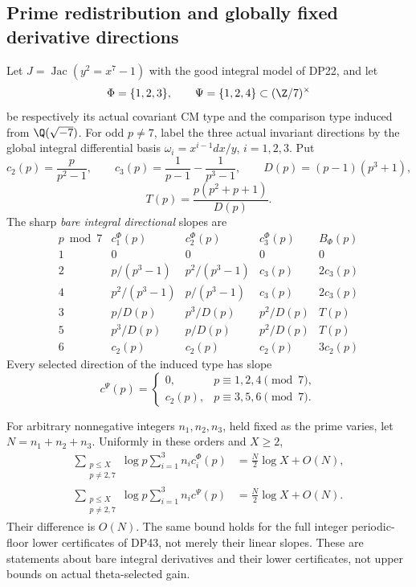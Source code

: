 \subsection{Prime redistribution and globally fixed derivative directions}

\begin{theorem}\label{DP53}
Let $J=\operatorname{Jac}(y^2=x^7-1)$ with the good integral model of DP22, and let
\[
 \Phi=\{1,2,3\},\qquad\Psi=\{1,2,4\}
       \subset(\Z/7)^\times
\]
be respectively its actual covariant CM type and the comparison type induced from $\Q(\sqrt{-7})$.
For odd $p\ne7$, label the three actual invariant directions by the global integral differential basis
$\omega_i=x^{i-1}dx/y$, $i=1,2,3$.
Put
\[
 c_2(p)=\frac{p}{p^2-1},\qquad
 c_3(p)=\frac1{p-1}-\frac1{p^3-1},\qquad
 D(p)=(p-1)(p^3+1),
\]
\[
 T(p)=\frac{p(p^2+p+1)}{D(p)}.
\]
The sharp \emph{bare integral directional} slopes are
\[
\begin{array}{c|ccc|c}
p\bmod7&c_1^\Phi(p)&c_2^\Phi(p)&c_3^\Phi(p)&B_\Phi(p)\\\hline
1&0&0&0&0\\
2&p/(p^3-1)&p^2/(p^3-1)&c_3(p)&2c_3(p)\\
4&p^2/(p^3-1)&p/(p^3-1)&c_3(p)&2c_3(p)\\
3&p/D(p)&p^3/D(p)&p^2/D(p)&T(p)\\
5&p^3/D(p)&p/D(p)&p^2/D(p)&T(p)\\
6&c_2(p)&c_2(p)&c_2(p)&3c_2(p)
\end{array}
\]
Every selected direction of the induced type has slope
\[
 c^\Psi(p)=
 \begin{cases}0,&p\equiv1,2,4\pmod7,\\
 c_2(p),&p\equiv3,5,6\pmod7.\end{cases}
\]

For arbitrary nonnegative integers $n_1,n_2,n_3$, held fixed as the prime varies, let $N=n_1+n_2+n_3$. Uniformly in these orders and $X\ge2$,
\begin{align}
 \sum_{\substack{p\le X\\p\ne2,7}}\log p
       \sum_{i=1}^3 n_i c_i^\Phi(p)
       &=\frac N2\log X+O(N),\label{eq:cmprimeactual}\\
 \sum_{\substack{p\le X\\p\ne2,7}}\log p
       \sum_{i=1}^3 n_i c^\Psi(p)
       &=\frac N2\log X+O(N).\label{eq:cmprimeinduced}
\end{align}
Their difference is $O(N)$. The same bound holds for the full integer periodic-floor lower certificates of DP43, not merely their linear slopes.
These are statements about bare integral derivatives and their lower certificates, not upper bounds on actual theta-selected gain.
\end{theorem}

